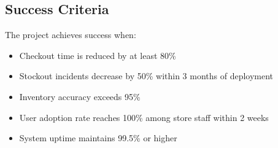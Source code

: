 \subsection{Success Criteria}

The project achieves success when:
\begin{itemize}
    \item Checkout time is reduced by at least 80\%
    \item Stockout incidents decrease by 50\% within 3 months of deployment
    \item Inventory accuracy exceeds 95\%
    \item User adoption rate reaches 100\% among store staff within 2 weeks
    \item System uptime maintains 99.5\% or higher
\end{itemize}
